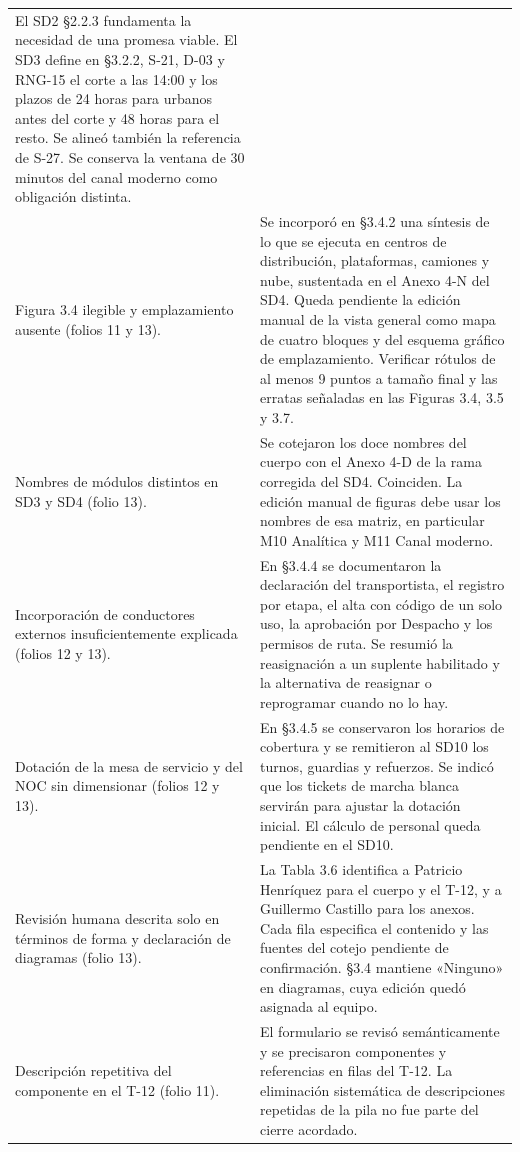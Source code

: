 \documentclass[11pt,letterpaper]{article}
\begin{document}
\begin{longtable}{@{}P{0.33\textwidth}P{\tabcolsep\relax}@{}}
El SD2 §2.2.3 fundamenta la necesidad de una promesa viable. El SD3 define en §3.2.2, S-21, D-03 y RNG-15 el corte a las 14:00 y los plazos de 24 horas para urbanos antes del corte y 48 horas para el resto. Se alineó también la referencia de S-27. Se conserva la ventana de 30 minutos del canal moderno como obligación distinta. \\
Figura 3.4 ilegible y emplazamiento ausente (folios 11 y 13). &
Se incorporó en §3.4.2 una síntesis de lo que se ejecuta en centros de distribución, plataformas, camiones y nube, sustentada en el Anexo 4-N del SD4. Queda pendiente la edición manual de la vista general como mapa de cuatro bloques y del esquema gráfico de emplazamiento. Verificar rótulos de al menos 9 puntos a tamaño final y las erratas señaladas en las Figuras 3.4, 3.5 y 3.7. \\
Nombres de módulos distintos en SD3 y SD4 (folio 13). &
Se cotejaron los doce nombres del cuerpo con el Anexo 4-D de la rama corregida del SD4. Coinciden. La edición manual de figuras debe usar los nombres de esa matriz, en particular M10 Analítica y M11 Canal moderno. \\
Incorporación de conductores externos insuficientemente explicada (folios 12 y 13). &
En §3.4.4 se documentaron la declaración del transportista, el registro por etapa, el alta con código de un solo uso, la aprobación por Despacho y los permisos de ruta. Se resumió la reasignación a un suplente habilitado y la alternativa de reasignar o reprogramar cuando no lo hay. \\
Dotación de la mesa de servicio y del NOC sin dimensionar (folios 12 y 13). &
En §3.4.5 se conservaron los horarios de cobertura y se remitieron al SD10 los turnos, guardias y refuerzos. Se indicó que los tickets de marcha blanca servirán para ajustar la dotación inicial. El cálculo de personal queda pendiente en el SD10. \\
Revisión humana descrita solo en términos de forma y declaración de diagramas (folio 13). &
La Tabla 3.6 identifica a Patricio Henríquez para el cuerpo y el T-12, y a Guillermo Castillo para los anexos. Cada fila especifica el contenido y las fuentes del cotejo pendiente de confirmación. §3.4 mantiene «Ninguno» en diagramas, cuya edición quedó asignada al equipo. \\
Descripción repetitiva del componente en el T-12 (folio 11). &
El formulario se revisó semánticamente y se precisaron componentes y referencias en filas del T-12. La eliminación sistemática de descripciones repetidas de la pila no fue parte del cierre acordado. \\

\end{longtable}
\end{document}
